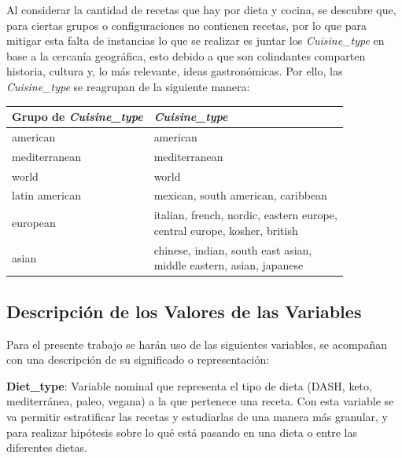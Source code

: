 \documentclass[12pt,a4paper]{article}
\begin{document}
{{            Al considerar la cantidad de recetas que hay por dieta y cocina, se 
            descubre que, para ciertas grupos o configuraciones no contienen recetas, 
            por lo que para mitigar esta falta de instancias lo que se realizar es juntar 
            los \emph{Cuisine\_type} en base a la cercanía geográfica, esto debido a 
            que son colindantes comparten historia, cultura y, lo más relevante, ideas 
            gastronómicas. Por ello, las \emph{Cuisine\_type} se reagrupan de la siguiente 
            manera: 

            \begin{center}
                \begin{tabular}{l|l}
                \toprule
                    Grupo de \emph{Cuisine\_type} & \emph{Cuisine\_type} \\
                \midrule
                    american & american \\
                    mediterranean & mediterranean \\
                    world & world \\
                    latin american & mexican, south american, caribbean \\
                    european & \makecell{italian, french, nordic, eastern europe,\\central europe, kosher, british} \\
                    asian & \makecell{chinese, indian, south east asian,\\middle eastern, asian, japanese} \\
                \bottomrule
                \end{tabular}
            \end{center}
        }

        \subsection{Descripción de los Valores de las Variables}
        {
            Para el presente trabajo se harán uso de las siguientes variables, se 
            acompañan con una descripción de su significado o representación:

            \begin{itemize}[label=\textbullet]
            {
                \item \textbf{Diet\_type}: Variable nominal que representa el tipo de 
                dieta (DASH, keto, mediterránea, paleo, vegana) a la que 
                pertenece una receta. Con esta variable se va permitir estratificar 
                las recetas y estudiarlas de una manera más granular, y para realizar 
                hipótesis sobre lo qué está pasando en una dieta o entre las diferentes dietas.
                
}
\end{itemize}}}
\end{document}
